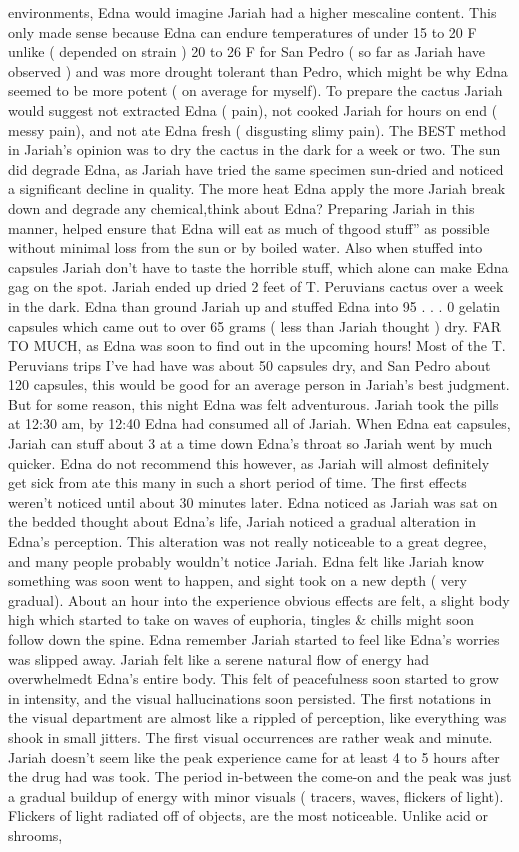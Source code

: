 \documentclass[12pt]{book}
\begin{document}
environments, Edna would imagine Jariah had a higher mescaline content. This only made sense because Edna can endure temperatures of under 15 to 20 F unlike ( depended on strain ) 20 to 26 F for San Pedro ( so far as Jariah have observed ) and was more drought tolerant than Pedro, which might be why Edna seemed to be more potent ( on average for myself). To prepare the cactus Jariah would suggest not extracted Edna ( pain), not cooked Jariah for hours on end ( messy pain), and not ate Edna fresh ( disgusting slimy pain). The BEST method in Jariah's opinion was to dry the cactus in the dark for a week or two. The sun did degrade Edna, as Jariah have tried the same specimen sun-dried and noticed a significant decline in quality. The more heat Edna apply the more Jariah break down and degrade any chemical,think about Edna? Preparing Jariah in this manner, helped ensure that Edna will eat as much of thgood stuff'' as possible without minimal loss from the sun or by boiled water. Also when stuffed into capsules Jariah don't have to taste the horrible stuff, which alone can make Edna gag on the spot. Jariah ended up dried 2 feet of T. Peruvians cactus over a week in the dark. Edna than ground Jariah up and stuffed Edna into 95 . . .  0 gelatin capsules which came out to over 65 grams ( less than Jariah thought ) dry. FAR TO MUCH, as Edna was soon to find out in the upcoming hours! Most of the T. Peruvians trips I've had have was about 50 capsules dry, and San Pedro about 120 capsules, this would be good for an average person in Jariah's best judgment. But for some reason, this night Edna was felt adventurous. Jariah took the pills at 12:30 am, by 12:40 Edna had consumed all of Jariah. When Edna eat capsules, Jariah can stuff about 3 at a time down Edna's throat so Jariah went by much quicker. Edna do not recommend this however, as Jariah will almost definitely get sick from ate this many in such a short period of time. The first effects weren't noticed until about 30 minutes later. Edna noticed as Jariah was sat on the bedded thought about Edna's life, Jariah noticed a gradual alteration in Edna's perception. This alteration was not really noticeable to a great degree, and many people probably wouldn't notice Jariah. Edna felt like Jariah know something was soon went to happen, and sight took on a new depth ( very gradual). About an hour into the experience obvious effects are felt, a slight body high which started to take on waves of euphoria, tingles \& chills might soon follow down the spine. Edna remember Jariah started to feel like Edna's worries was slipped away. Jariah felt like a serene natural flow of energy had overwhelmedt Edna's entire body. This felt of peacefulness soon started to grow in intensity, and the visual hallucinations soon persisted. The first notations in the visual department are almost like a rippled of perception, like everything was shook in small jitters. The first visual occurrences are rather weak and minute. Jariah doesn't seem like the peak experience came for at least 4 to 5 hours after the drug had was took. The period in-between the come-on and the peak was just a gradual buildup of energy with minor visuals ( tracers, waves, flickers of light). Flickers of light radiated off of objects, are the most noticeable. Unlike acid or shrooms, 
\end{document}
